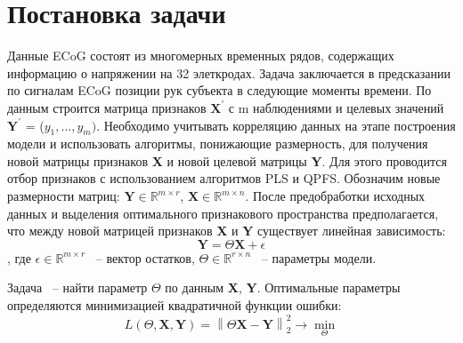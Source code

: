 \documentclass[12pt,twoside]{article}
\newcommand{\norm}[1]{\left\lVert#1\right\rVert}
\begin{document}
\section{Постановка задачи}

Данные ECoG состоят из многомерных временных рядов, содержащих информацию о напряжении на 32 элеткродах. Задача заключается в предсказании по сигналам ECoG позиции рук субъекта в следующие моменты времени. По данным строится матрица 
признаков $\textbf{X}^\prime$ с m наблюдениями и целевых значений $\textbf{Y}^\prime$ = ($y_1,\dots, y_m)$. 
Необходимо учитывать корреляцию данных на этапе построения модели и использовать алгоритмы,
понижающие размерность, для получения новой матрицы признаков \textbf{X} и новой целевой
матрицы \textbf{Y}.  Для этого проводится
отбор признаков с использованием алгоритмов PLS и QPFS. Обозначим новые размерности матриц: $\textbf{Y} \in \mathbb{R}^{m\times r}$, $\textbf{X} \in \mathbb{R}^{m\times n}$. После предобработки исходных данных и выделения оптимального признакового пространства предполагается, что между новой матрицей признаков \textbf{X} и \textbf{Y} существует линейная зависимость: $$ \textbf{Y} = \Theta \textbf{X} + \epsilon $$, где $\epsilon \in \mathbb{R}^{m\times r}$ ~-- вектор остатков, $\Theta \in \mathbb{R}^{r\times n}$ ~-- параметры модели. 

Задача ~-- найти параметр $\Theta$ по данным \textbf{X}, \textbf{Y}. Оптимальные параметры определяются минимизацией квадратичной функции ошибки:
$$ L(\Theta, \textbf{X}, \textbf{Y}) = \norm{\Theta \textbf{X} - \textbf{Y}}^2_2 \to \min_{\Theta} $$


{}

\end{document}
